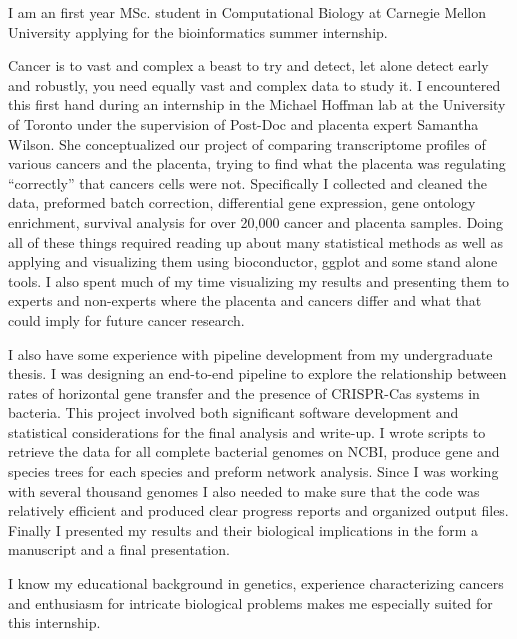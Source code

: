 \documentclass[11pt, a4paper]{./Awesome-CV/awesome-cv}
\begin{document}
\vspace*{\fill}
\makelettertitle %

\begin{cvletter}
\hspace{8mm} I am an first year MSc. student in Computational Biology at Carnegie Mellon University applying for the bioinformatics summer internship.
\par \hspace{8mm}
Cancer is to vast and complex a beast to try and detect, let alone detect early and robustly, you need equally vast and complex data to study it.
I encountered this first hand during an internship in the Michael Hoffman lab at the University of Toronto under the supervision of Post-Doc and placenta expert Samantha Wilson.
She conceptualized our project of comparing transcriptome profiles of various cancers and the placenta, trying to find what the placenta was regulating “correctly” that cancers cells were not.
Specifically I collected and cleaned the data, preformed batch correction, differential gene expression, gene ontology enrichment, survival analysis for over 20,000 cancer and placenta samples.
Doing all of these things required reading up about many statistical methods as well as applying and visualizing them using bioconductor, ggplot and some stand alone tools.
I also spent much of my time visualizing my results and presenting them to experts and non-experts where the placenta and cancers differ and what that could imply for future cancer research.
\par \hspace{8mm}
I also have some experience with pipeline development from my undergraduate thesis.
I was designing an end-to-end pipeline to explore the relationship between rates of horizontal gene transfer and the presence of CRISPR-Cas systems in bacteria.
This project involved both significant software development and statistical considerations for the final analysis and write-up.
I wrote scripts to retrieve the data for all complete bacterial genomes on NCBI, produce gene and species trees for each species and preform network analysis.
Since I was working with several thousand genomes I also needed to make sure that the code was relatively efficient and produced clear progress reports and organized output files.
Finally I presented my results and their biological implications in the form a manuscript and a final presentation.
\par \hspace{8mm}
I know my educational background in genetics, experience characterizing cancers and enthusiasm for intricate biological problems makes me especially suited for this internship.

\end{cvletter}
\makeletterclosing
\vspace*{\fill}
\end{document}
